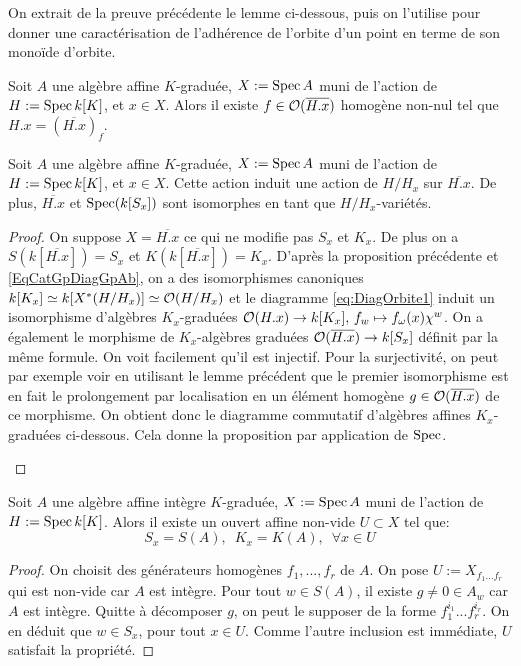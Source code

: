 On extrait de la preuve précédente le lemme ci-dessous, puis on l'utilise pour donner une caractérisation de l'adhérence de l'orbite d'un point en terme de son monoïde d'orbite.

\begin{lem}
Soit $A$ une algèbre affine $K$-graduée, $X:=\operatorname{Spec} A$ muni de l'action de $H:=\operatorname{Spec} k[K]$, et $x\in X$. Alors il existe $f\in\mathcal{O}(\overline{H.x})$ homogène non-nul tel que $H.x=(\overline{H.x})_f$.
\end{lem}

\begin{prop}[Car. 0]
Soit $A$ une algèbre affine $K$-graduée, $X:=\operatorname{Spec} A$ muni de l'action de $H:=\operatorname{Spec} k[K]$, et $x\in X$. Cette action induit une action de $H/H_x$ sur $\overline{H.x}$. De plus, $\overline{H.x}$ et $\operatorname{Spec}(k[S_x])$ sont isomorphes en tant que $H/H_x$-variétés.
\end{prop}
\begin{proof}
On suppose $X=\overline{H.x}$ ce qui ne modifie pas $S_x$ et $K_x$. De plus on a $S(k[\overline{H.x}])=S_x$ et $K(k[\overline{H.x}])=K_x$. D'après la proposition précédente et \ref{EqCatGpDiagGpAb}, on a des isomorphismes canoniques $k[K_x]\simeq k[X^*(H/H_x)]\simeq \mathcal{O}(H/H_x)$ et le diagramme \ref{eq:DiagOrbite1} induit un isomorphisme d'algèbres $K_x$-graduées $\mathcal{O}(H.x)\rightarrow k[K_x],\, f_w \mapsto f_\omega(x)\chi^w$. On a également le morphisme de $K_x$-algèbres graduées $\mathcal{O}(\overline{H.x})\rightarrow k[S_x]$ définit par la même formule. On voit facilement qu'il est injectif. Pour la surjectivité, on peut par exemple voir en utilisant le lemme précédent que le premier isomorphisme est en fait le prolongement par localisation en un élément homogène $g\in\mathcal{O}(\overline{H.x})$ de ce morphisme. On obtient donc le diagramme commutatif d'algèbres affines $K_x$-graduées ci-dessous. Cela donne la proposition par application de $\operatorname{Spec}$.

	\begin{center}
	\end{center}

\end{proof}


\begin{prop}
Soit $A$ une algèbre affine intègre $K$-graduée, $X:=\operatorname{Spec} A$ muni de l'action de $H:=\operatorname{Spec} k[K]$. Alors il existe un ouvert affine non-vide $U\subset X$ tel que:
$$S_x=S(A),\,\,\, K_x=K(A),\,\,\, \forall x\in U$$
\end{prop}
\begin{proof}
On choisit des générateurs homogènes $f_1,...,f_r$ de $A$. On pose $U:=X_{f_1...f_r}$ qui est non-vide car $A$ est intègre. Pour tout $w \in S(A)$, il existe $g\neq0 \in A_w$ car $A$ est intègre. Quitte à décomposer $g$,  on peut le supposer de la forme $f_1^{i_1}...f_r^{i_r}$. On en déduit que $w \in S_x$, pour tout $x\in U$. Comme l'autre inclusion est immédiate, $U$ satisfait la propriété.
\end{proof}


